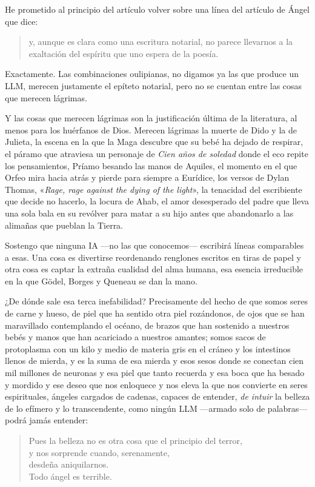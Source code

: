 \documentclass[11pt,a4paper]{article}
\begin{document}
He prometido al principio del artículo volver sobre una línea del artículo de Ángel que dice:


\begin{quotation}
y, aunque es clara como una escritura notarial, no parece llevarnos a la exaltación del espíritu que uno espera de la poesía.
\end{quotation}

Exactamente. Las combinaciones oulipianas, no digamos ya las que produce un LLM, merecen justamente el epíteto notarial, pero no se cuentan entre las cosas que merecen lágrimas.

Y las cosas que merecen lágrimas son la justificación última de la literatura, al menos para los huérfanos de Dios.
Merecen lágrimas la muerte de Dido y la de Julieta, la escena en la que la Maga descubre que su bebé ha dejado de respirar, el páramo que atraviesa un personaje de \emph{Cien años de soledad} donde el eco repite los pensamientos, Príamo besando las manos de Aquiles, el momento en el que Orfeo mira hacia atrás y pierde para siempre a Eurídice, los versos de Dylan Thomas, «\emph{Rage, rage against the dying of the light}», la tenacidad del escribiente que decide no hacerlo, la locura de Ahab, el amor desesperado del padre que lleva una sola bala en su revólver para matar a su hijo antes que abandonarlo a las alimañas que pueblan la Tierra.

Sostengo que ninguna IA ---no las que conocemos--- escribirá líneas comparables a esas. Una cosa es divertirse reordenando renglones escritos en tiras de papel y otra cosa es captar la extraña cualidad del alma humana, esa esencia irreducible en la que Gödel, Borges y Queneau se dan la mano.

¿De dónde sale esa terca inefabilidad? Precisamente del hecho de que somos seres de carne y hueso, de piel que ha sentido otra piel rozándonos, de ojos que se han maravillado contemplando el océano, de brazos que han sostenido a nuestros bebés y manos que han acariciado a nuestros amantes; somos sacos de protoplasma con un kilo y medio de materia gris en el cráneo y los intestinos llenos de mierda, y es la suma de esa mierda y esos sesos donde se conectan cien mil millones de neuronas y esa piel que tanto recuerda y esa boca que ha besado y mordido y ese deseo que nos enloquece y nos eleva la que nos convierte en seres espirituales, ángeles cargados de cadenas, capaces de entender, \emph{de intuir} la belleza de lo efímero y lo transcendente, como ningún LLM ---armado solo de palabras--- podrá jamás entender:

\begin{verse}
Pues la belleza no es otra cosa que el principio del terror,\\
y nos sorprende cuando, serenamente,\\
desdeña aniquilarnos.\\
Todo ángel es terrible.
\end{verse}
\end{document}
